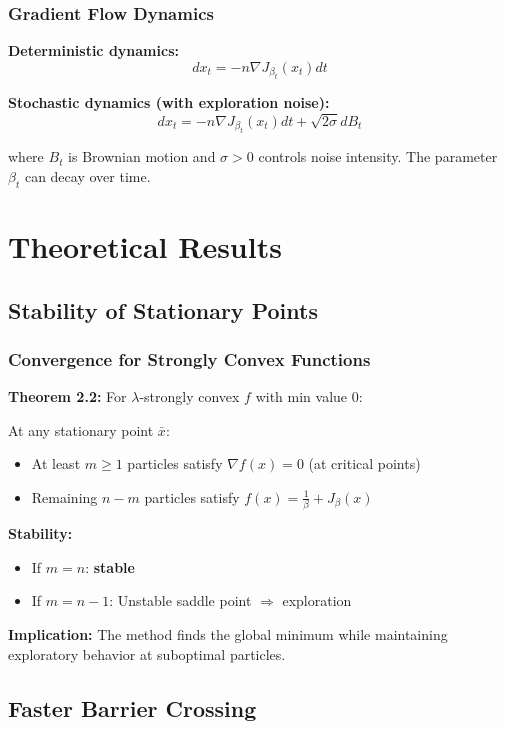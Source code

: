 \documentclass{beamer}
\begin{document}
\begin{frame}
\frametitle{Gradient Flow Dynamics}

\textbf{Deterministic dynamics:}
\begin{equation}
dx_t = -n \nabla J_{\beta_t}(x_t) dt
\end{equation}

\textbf{Stochastic dynamics (with exploration noise):}
\begin{equation}
dx_t = -n \nabla J_{\beta_t}(x_t) dt + \sqrt{2\sigma} dB_t
\end{equation}

where $B_t$ is Brownian motion and $\sigma > 0$ controls noise intensity. The parameter $\beta_t$ can decay over time.
\end{frame}

\section{Theoretical Results}

\subsection{Stability of Stationary Points}

\begin{frame}
\frametitle{Convergence for Strongly Convex Functions}

\textbf{Theorem 2.2:} For $\lambda$-strongly convex $f$ with min value 0:

At any stationary point $\bar{x}$:
\begin{itemize}
  \item At least $m \geq 1$ particles satisfy $\nabla f(x) = 0$ (at critical points)
  \item Remaining $n-m$ particles satisfy $f(x) = \frac{1}{\beta} + J_\beta(x)$
\end{itemize}
\pause

\textbf{Stability:}
\begin{itemize}
  \item If $m = n$: \textbf{stable}
  \item If $m = n-1$: Unstable saddle point $\Rightarrow$ exploration
\end{itemize}
\pause
\textbf{Implication:} The method finds the global minimum while maintaining exploratory behavior at suboptimal particles.
\end{frame}

\subsection{Faster Barrier Crossing}
\end{document}
